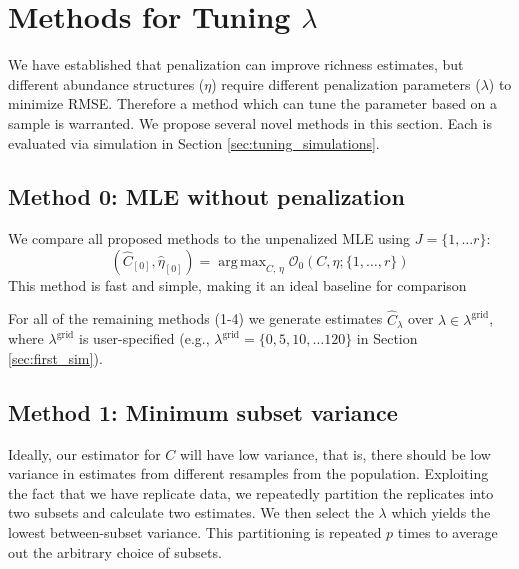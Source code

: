 \documentclass[oupdraft]{bio}
\DeclareMathOperator*{\argmax}{arg\,max}
\newcommand{\lambdagrid}{\lambda^{\text{grid}}}
\begin{document}
%
%
%
\section{Methods for Tuning $\lambda$}
\label{sec:tuning_proposals}

We have established that penalization can improve richness estimates, but different abundance structures ($\eta$) require different penalization parameters ($\lambda$) to minimize RMSE.  Therefore a method which can tune the parameter based on a sample is warranted.  We propose several novel methods in this section.  Each is evaluated via simulation in Section \ref{sec:tuning_simulations}.

\setcounter{subsection}{-1}
\subsection{Method 0: MLE without penalization}

We compare all proposed methods to the unpenalized MLE using $J = \{1, \dots r \}$:
\begin{equation}
\left(\widehat{C}_{[0]},  \widehat{\eta}_{[0]} \right) = \argmax_{C, \, \eta}  \mathcal{O}_{0}\left(C, \eta ; \{1, \dots , r\} \right) \label{eq:c_hat_0}
\end{equation}
This method is fast and simple, making it an ideal baseline for comparison

For all of the remaining methods (1-4) we generate estimates $\widehat{C}_\lambda$ over $\lambda \in \lambda^{\text{grid}}$, where $\lambdagrid$ is user-specified (e.g., $\lambdagrid = \{0, 5, 10, \dots 120\}$ in Section \ref{sec:first_sim}).  %

%
%
\subsection{Method 1: Minimum subset variance}

Ideally, our estimator for $C$ will have low variance, that is, there should be low variance in estimates from different resamples from the population.
Exploiting the fact that we have replicate data, we repeatedly partition the replicates into two subsets and calculate two estimates.  We then select the $\lambda$ which yields the lowest between-subset variance.  This partitioning is repeated $p$ times to average out the arbitrary choice of subsets.
\end{document}

